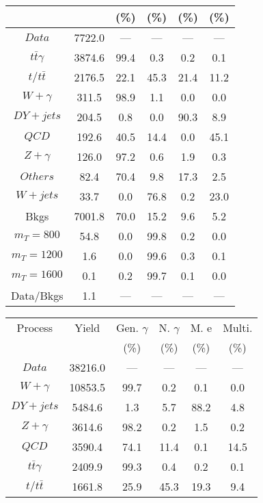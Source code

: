 \begin{figure}
\begin{minipage}[c]{0.32\textwidth}
{\begin{tabular}{cccccc}
 &  & (\%) & (\%) & (\%) & (\%)  \\
\hline
                                                                      $ Data $ &  7722.0 &  --- &  --- &  --- &  ---\\
$ t\bar{t}\gamma $ &  3874.6 &  99.4 &  0.3 &  0.2 &  0.1\\
$ t/t\bar{t} $ &  2176.5 &  22.1 &  45.3 &  21.4 &  11.2\\
$ W+\gamma $ &  311.5 &  98.9 &  1.1 &  0.0 &  0.0\\
$ DY+jets $ &  204.5 &  0.8 &  0.0 &  90.3 &  8.9\\
$ QCD $ &  192.6 &  40.5 &  14.4 &  0.0 &  45.1\\
$ Z+\gamma $ &  126.0 &  97.2 &  0.6 &  1.9 &  0.3\\
$ Others $ &  82.4 &  70.4 &  9.8 &  17.3 &  2.5\\
$ W+jets $ &  33.7 &  0.0 &  76.8 &  0.2 &  23.0\\
Bkgs &  7001.8 &  70.0 &  15.2 &  9.6 &  5.2\\
$ m_{T} = 800 $ &  54.8 &  0.0 &  99.8 &  0.2 &  0.0\\
$ m_{T} = 1200 $ &  1.6 &  0.0 &  99.6 &  0.3 &  0.1\\
$ m_{T} = 1600 $ &  0.1 &  0.2 &  99.7 &  0.1 &  0.0\\
Data/Bkgs &  1.1 &  --- &  --- &  --- &  ---\\
\hline
\end{tabular}
}
\end{minipage}
\begin{minipage}[c]{0.32\textwidth}
\centering
\tiny{
\begin{tabular}{cccccc}
\hline
Process & Yield & Gen. $\gamma$ & N. $\gamma$ & M. e & Multi. \\
 &  & (\%) & (\%) & (\%) & (\%)  \\
\hline
                                                                      $ Data $ &  38216.0 &  --- &  --- &  --- &  ---\\
$ W+\gamma $ &  10853.5 &  99.7 &  0.2 &  0.1 &  0.0\\
$ DY+jets $ &  5484.6 &  1.3 &  5.7 &  88.2 &  4.8\\
$ Z+\gamma $ &  3614.6 &  98.2 &  0.2 &  1.5 &  0.2\\
$ QCD $ &  3590.4 &  74.1 &  11.4 &  0.1 &  14.5\\
$ t\bar{t}\gamma $ &  2409.9 &  99.3 &  0.4 &  0.2 &  0.1\\
$ t/t\bar{t} $ &  1661.8 &  25.9 &  45.3 &  19.3 &  9.4\\

\end{tabular}}
\end{minipage}
\end{figure}
